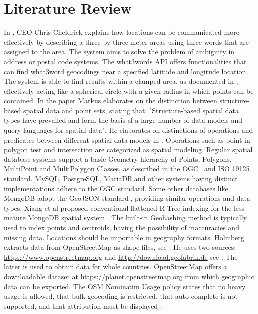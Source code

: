 \section{Literature Review}
In \cite{w3w}, CEO Chris Cheldrick explains how locations can be communicated more effectively by describing a three by three meter areas using three words that are assigned to the area. The system aims to solve the problem of ambiguity in address or postal code systems. The what3words API offers functionalities that can find what3word geocodings near a specified latitude and longitude location. The system is able to find results within a clamped area, as documented in \cite{w3w-api}, effectively acting like a spherical circle with a given radius in which points can be contained. In the paper \cite{spatial-data-types} Markus elaborates on the distinction between structure-based spatial data and point sets, stating that: "Structure-based spatial data types have prevailed and form the basis of a large number of data models and query languages for spatial data". He elaborates on distinctions of operations and predicates between different spatial data models in \cite{geometry}. Operations such as point-in-polygon test and intersection are categorized as spatial modeling. Regular spatial database systems support a basic Geometry hierarchy of Points, Polygons, MultiPoint and MultiPolygon Classes, as described in the OGC~\cite{SFA} and ISO 19125~\cite{ISO-19125} standard. MySQL, PostgreSQL, MariaDB and other systems having distinct implementations adhere to the OGC standard. Some other databases like MongoDB adopt the GeoJSON standard \cite{MongoDB-GeoJSON}, providing similar operations and data types. Xiang et al proposed conventional flattened R-Tree indexing for the less mature MongoDB spatial system \cite{MongoDB-implementation}. The built-in Geohashing method is typically used to index points and centroids, having the possibility of inaccuracies and missing data. Locations should be importable in geography formats. Holmberg extracts data from OpenStreetMap as shape files, see \cite[Chapter~6]{openstreetmap}. He uses two sources: \url{https://www.openstreetmap.org} and \url{http://download.geofabrik.de} see \cite[Chapter~7.3]{openstreetmap}. The latter is used to obtain data for whole countries. OpenStreetMap offers a downloadable dataset at \url{https://planet.openstreetmap.org} from which geographic data can be exported.
The OSM Nominatim Usage policy states that no heavy usage is allowed, that bulk geocoding is restricted, that auto-complete is not supported, and that attribution must be displayed \cite{OSM-policy}.

